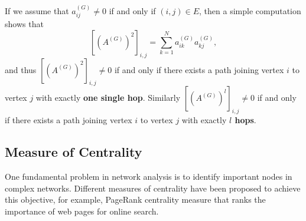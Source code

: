 If we assume that $a_{ij}^{(G)} \neq 0$ if and only if $(i,j) \in E$, then a simple computation shows that
$$
\left[ \left(A^{(G)} \right)^2 \right]_{i,j} = \sum_{k=1}^N a_{ik}^{(G)} a_{kj}^{(G)},
$$
and thus 
$
\left[ \left(A^{(G)} \right)^2 \right]_{i,j} \neq 0 
$
if and only if there exists a path joining vertex $i$ to vertex $j$ with exactly \textbf{one single hop}. Similarly
$
\left[ \left(A^{(G)} \right)^l \right]_{i,j} \neq 0 
$
if and only if there exists a path joining vertex $i$ to vertex $j$ with exactly \textbf{ $l$ hops}.

\subsection{Measure of Centrality}

One fundamental problem in network analysis is to identify important nodes in complex networks. Different measures of centrality have been proposed to achieve this objective, for example, PageRank centrality measure \cite{page1999pagerank} that ranks the importance of web pages for online search.

